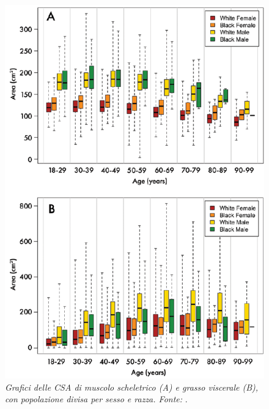 \begin{figure}[htp]
\centering
\includegraphics[scale=0.95]{Immagini/magudia_smvat.png}
\caption{\label{fig:magudia_smvat} \textit{Grafici delle CSA di muscolo scheletrico (A) e grasso viscerale (B), con popolazione divisa per sesso e razza. Fonte:} \cite{Magudia2021}.}
\end{figure}

